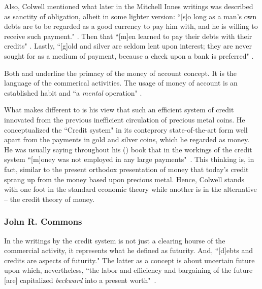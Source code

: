 Also, Colwell mentioned what later in the Mitchell Innes writings  was described as sanctity of obligation, albeit in some lighter version: ``[s]o long as a man's own debts are to be regarded as a good currency to pay him with, and he is willing to receive such payment." \citeyearpar[p.~691]{colwell1860}. Then that ``[m]en learned to pay their debts with their credits" \citeyearpar[p.~691]{colwell1860}. Lastly, ``[g]old and silver are seldom lent upon interest; they are never sought for as a medium of payment, because a check upon a bank is preferred" \citeyearpar[p.~694]{colwell1860}. 

Both \citeauthor{colwell1859} and \citeauthor{innes1913} underline the primacy of the money of account concept. It is the language of the commerical activities. The usage of money of account is an established habit and ``a \textit{mental} operation" \citep[p.~3, emphasis added]{colwell1859}. 

What makes \citeauthor{colwell1859} different to \citeauthor{innes1913} is his view that such an efficient system of credit innovated from the previous inefficient circulation of precious metal coins. He conceptualized the ``Credit system" in its conteprory state-of-the-art form well apart from the payments in gold and silver coins, which he regarded as money. He was usually saying throughout his (\citeyear{colwell1859}) book that in the workings of the credit system ``[m]oney was not employed in any large payments"~\citep[p.~190]{colwell1859}.   This thinking is, in fact, similar to the present orthodox presentation of money that today's credit sprang up from the money based upon precious metal. Hence, Colwell stands with one foot in the standard economic theory while another is in the alternative -- the credit theory of money. 

%
%
\subsubsection{John R. Commons}

In the writings by \citeauthor{commons1951} the credit system is not just a clearing hourse of the commercial activity, it represents what he defined as futurity. And, ``[d]ebts and credits are aspects of futurity." The latter as a concept is about uncertain future upon which, nevertheless, ``the labor and efficiency and bargaining of the future [are] capitalized \textit{beckward} into a present worth"~\citep[p.~103,105]{commons1951}.

